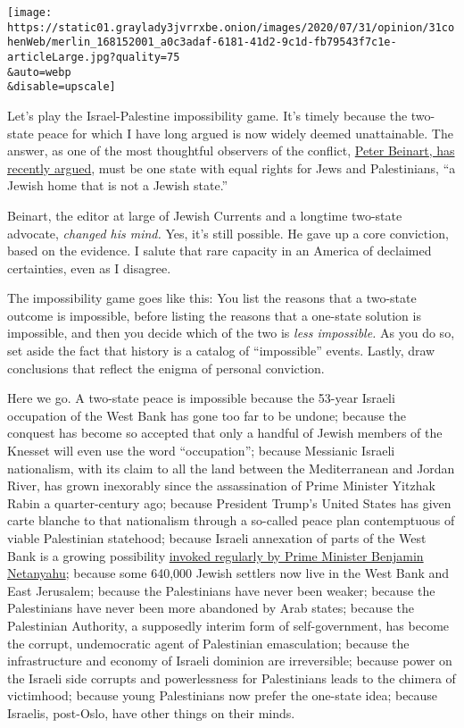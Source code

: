 \texttt{[image: https://static01.graylady3jvrrxbe.onion/images/2020/07/31/opinion/31cohenWeb/merlin\_168152001\_a0c3adaf-6181-41d2-9c1d-fb79543f7c1e-articleLarge.jpg?quality=75\\\&auto=webp\\\&disable=upscale]}

Let's play the Israel-Palestine impossibility game. It's timely because
the two-state peace for which I have long argued is now widely deemed
unattainable. The answer, as one of the most thoughtful observers of the
conflict,
\href{https://www.nytimes3xbfgragh.onion/2020/07/08/opinion/israel-annexation-two-state-solution.html}{Peter
Beinart, has recently argued}, must be one state with equal rights for
Jews and Palestinians, ``a Jewish home that is not a Jewish state.''

Beinart, the editor at large of Jewish Currents and a longtime two-state
advocate, \emph{changed his mind.} Yes, it's still possible. He gave up
a core conviction, based on the evidence. I salute that rare capacity in
an America of declaimed certainties, even as I disagree.

The impossibility game goes like this: You list the reasons that a
two-state outcome is impossible, before listing the reasons that a
one-state solution is impossible, and then you decide which of the two
is \emph{less impossible.} As you do so, set aside the fact that history
is a catalog of ``impossible'' events. Lastly, draw conclusions that
reflect the enigma of personal conviction.

Here we go. A two-state peace is impossible because the 53-year Israeli
occupation of the West Bank has gone too far to be undone; because the
conquest has become so accepted that only a handful of Jewish members of
the Knesset will even use the word ``occupation''; because Messianic
Israeli nationalism, with its claim to all the land between the
Mediterranean and Jordan River, has grown inexorably since the
assassination of Prime Minister Yitzhak Rabin a quarter-century ago;
because President Trump's United States has given carte blanche to that
nationalism through a so-called peace plan contemptuous of viable
Palestinian statehood; because Israeli annexation of parts of the West
Bank is a growing possibility
\href{https://www.nytimes3xbfgragh.onion/2020/01/28/world/middleeast/israel-west-bank-annex-sovereignty.html}{invoked
regularly by Prime Minister Benjamin Netanyahu}; because some 640,000
Jewish settlers now live in the West Bank and East Jerusalem; because
the Palestinians have never been weaker; because the Palestinians have
never been more abandoned by Arab states; because the Palestinian
Authority, a supposedly interim form of self-government, has become the
corrupt, undemocratic agent of Palestinian emasculation; because the
infrastructure and economy of Israeli dominion are irreversible; because
power on the Israeli side corrupts and powerlessness for Palestinians
leads to the chimera of victimhood; because young Palestinians now
prefer the one-state idea; because Israelis, post-Oslo, have other
things on their minds.


